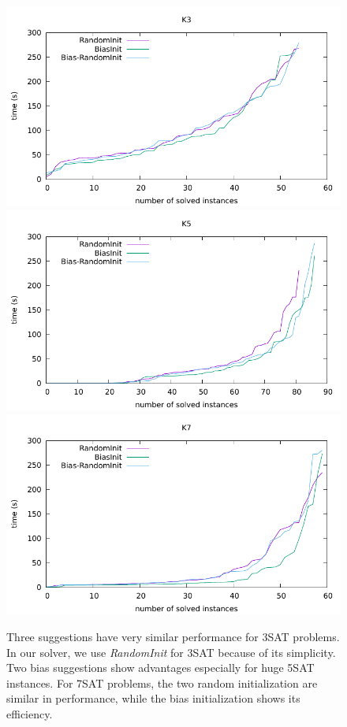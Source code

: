 \documentclass[12pt,a4paper,twoside]{scrartcl}
\numberwithin{equation}{section}
\begin{document}
\begin{figure}[H]
 \label{Experiment cactus}
  \includegraphics[scale =1]{DATA/K3/e1.pdf}
  \includegraphics[scale = 1]{DATA/K5/e1.pdf}
  \includegraphics[scale = 1]{DATA/K7/e1.pdf}
  \label{Experiment 1 k357 cactus plot}
  \caption{Three suggestions have very similar performance for 3SAT problems. In our solver, we use \emph{RandomInit} for 3SAT because of its simplicity. Two bias suggestions show advantages especially for huge 5SAT instances. For 7SAT problems, the two random initialization are similar in performance, while the bias initialization shows its efficiency.}
\end{figure}
\clearpage
\end{document}
